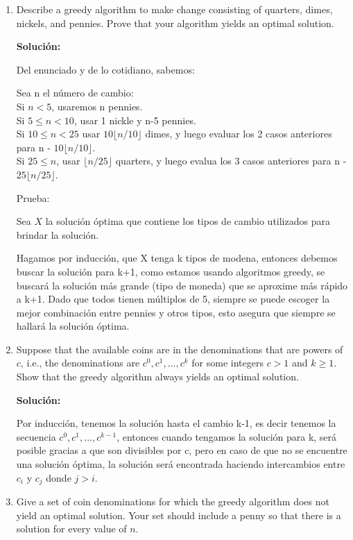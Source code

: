\documentclass{article}
\begin{document}
\begin{enumerate}[label=(\alph*)]
  \item Describe a greedy algorithm to make change consisting of quarters, dimes, nickels, and pennies. Prove that your algorithm yields an optimal solution.
  
  \textbf{Solución:}
  
  Del enunciado y de lo cotidiano, sabemos:
  
  Sea n el número de cambio:\\
  Si $n<5$, usaremos n pennies.\\
  Si $5 \leq n < 10$, usar 1 nickle y n-5 pennies.\\
  Si $10 \leq n < 25$ usar $10\lfloor n/10 \rfloor$ dimes, y luego evaluar los 2 casos anteriores para n - $10\lfloor n/10 \rfloor$.\\
  Si $25 \leq n$, usar $\lfloor n/25 \rfloor$ quarters, y luego evalua los 3 casos anteriores para n - $25 \lfloor n/25 \rfloor$.
  
  Prueba:
  
  Sea $X$ la solución óptima que contiene los tipos de cambio utilizados para brindar la solución.
  
  Hagamos por inducción, que X tenga k tipos de modena, entonces debemos buscar la solución para k+1, como estamos usando algoritmos greedy, se buscará la solución más grande (tipo de moneda) que se aproxime más rápido a k+1. Dado que todos tienen múltiplos de 5, siempre se puede escoger la mejor combinación entre pennies y otros tipos, esto asegura que siempre se hallará la solución óptima.
  
  \item Suppose that the available coins are in the denominations that are powers of $c$, i.e., the denominations are $c^0, c^1, ..., c^k$ for some  integers $c>1$ and $k \geq 1$. Show that the greedy algorithm always yields an optimal solution.
  
  \textbf{Solución:}
  
  Por inducción, tenemos la solución hasta el cambio k-1, es decir tenemos la secuencia $c^0, c^1, ..., c^{k-1}$, entonces cuando tengamos la solución para k, será posible gracias a que son divisibles por c, pero en caso de que no se encuentre una solución óptima, la solución será encontrada haciendo intercambios entre $c_i$ y $c_j$ donde $j>i$.
  
  \item Give a set of coin denominations for which the greedy algorithm does not yield an optimal solution. Your set should include a penny so that there is a solution for every value of $n$.
  

\end{enumerate}
\end{document}
